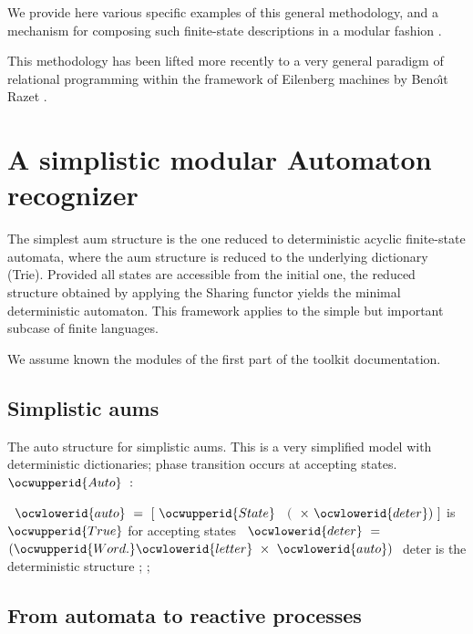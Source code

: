 \documentclass[12pt]{article}
\begin{document}
We provide here various specific examples of this general methodology, and a mechanism
for composing such finite-state descriptions in a modular fashion \cite{2006-Huet-Razet}.

This methodology has been lifted more recently
to a very general paradigm of relational 
programming within the framework of Eilenberg machines by Beno{\^\i}t Razet
\cite{2008-Huet-Razet, Razet08a, Razet08b, Razet09}.

\section{A simplistic modular Automaton recognizer}

The simplest aum structure is the one reduced to deterministic acyclic finite-state automata,
where the aum structure is reduced to the underlying dictionary (Trie). Provided all
states are accessible from the initial one, the reduced structure obtained by applying the
Sharing functor yields the minimal deterministic automaton. This framework applies to the
simple but important subcase of finite languages.

We assume known the modules of the first part of the toolkit documentation. 

\subsection{Simplistic aums}

\label{../ML/aum0.mli:0}%
The auto structure for simplistic aums. This is a very simplified model with 
   deterministic dictionaries; phase transition occurs at accepting states. 
\ocweol
\label{../ML/aum0.mli:778}%
\medskip
\ocwbegincode{}\ocwindent{0.00em}
~$\ocwupperid{Auto}~:~$\medskip

\label{../ML/aum0.mli:797}%
\ocwindent{0.00em}
~$\ocwlowerid{auto}~=~[~\ocwupperid{State}~$~$($~$\times{}~\ocwlowerid{deter})~]$\ocweol
\ocwindent{1.50em}
\ocwbc{} \ocwbegindcode{}\ocwenddcode{} is \ocwbegindcode{}$\ocwupperid{True}$\ocwenddcode{} for accepting states \ocwec{}\ocweol
\ocwindent{0.00em}
~$\ocwlowerid{deter}~=~$~$(\ocwupperid{Word.}\ocwlowerid{letter}~\times{}~\ocwlowerid{auto})~$\ocweol
\ocwindent{1.50em}
\ocwbc{} deter is the deterministic structure \ocwec{}\ocweol
\ocwindent{0.00em}
;\ocweol
\ocwindent{0.00em}
;\ocweol
\ocweol
\ocwendcode{}\subsection{From automata to reactive processes}
\end{document}

